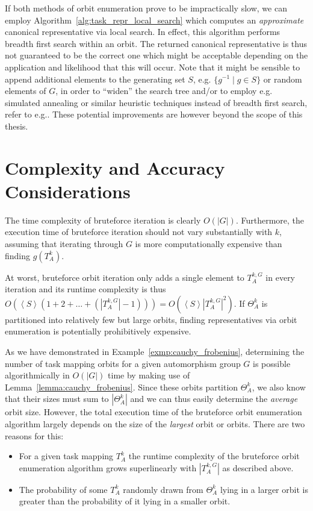 If both methods of orbit enumeration prove to be impractically slow, we can
employ Algorithm~\ref{alg:task_repr_local_search} which computes an
\textit{approximate} canonical representative via local search. In effect, this
algorithm performs breadth first search within an orbit. The returned canonical
representative is thus not guaranteed to be the correct one which might be
acceptable depending on the application and likelihood that this will occur.
Note that it might be sensible to append additional elements to the generating
set $S$, e.g. $\{g^{-1} \mid g \in S\}$ or random elements of $G$, in order to
``widen'' the search tree and/or to employ e.g. simulated annealing or similar
heuristic techniques instead of breadth first search, refer to
e.g.\cite{Russell}. These potential improvements are however beyond the scope
of this thesis.

\section{Complexity and Accuracy Considerations}
\label{sec:tmor_complexity_and_accuracy_considerations}

The time complexity of bruteforce iteration is clearly $O(|G|)$.  Furthermore,
the execution time of bruteforce iteration should not vary substantially with
$k$, assuming that iterating through $G$ is more computationally expensive than
finding $g(T_{A}^k)$.

At worst, bruteforce orbit iteration only adds a single element to $T_A^{k,G}$
in every iteration and its runtime complexity is thus $O(\left<S\right> (1 + 2
+ \dots + (|T_A^{k,G}| - 1))) = O(\left<S\right> |T_A^{k,G}|^2)$. If
$\Theta_{A}^k$ is partitioned into relatively few but large orbits, finding
representatives via orbit enumeration is potentially prohibitively expensive.

As we have demonstrated in Example~\ref{exmp:cauchy_frobenius}, determining the
number of task mapping orbits for a given automorphism group $G$ is possible
algorithmically in $O(|G|)$ time by making use of
Lemma~\ref{lemma:cauchy_frobenius}. Since these orbits partition
$\Theta_{A}^k$, we also know that their sizes must sum to $|\Theta_{A}^k|$ and
we can thus easily determine the \textit{average} orbit size. However, the
total execution time of the bruteforce orbit enumeration algorithm largely
depends on the size of the \textit{largest} orbit or orbits.  There are two
reasons for this:

\begin{itemize}
\item For a given task mapping $T_{A}^k$ the runtime complexity of the
bruteforce orbit enumeration algorithm grows superlinearly with
$|T_{A}^{k,G}|$ as described above.

\item The probability of some $T_A^k$ randomly drawn from $\Theta_A^k$ lying in
a larger orbit is greater than the probability of it lying in a smaller orbit.
\end{itemize}

